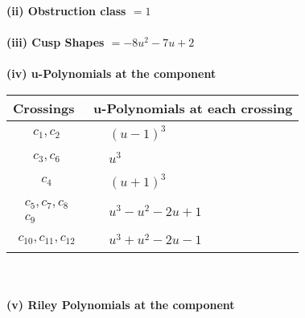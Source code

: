 \documentclass[1p]{elsarticle_modified}
\theoremstyle{definition}
\begin{document}
\flushleft \textbf{(ii) Obstruction class $= 1$}\\~\\
\flushleft \textbf{(iii) Cusp Shapes $= -8 u^2-7 u+2$}\\~\\
\newpage\renewcommand{\arraystretch}{1}
\flushleft \textbf{(iv) u-Polynomials at the component}\newline \\
\begin{tabular}{m{50pt}|m{274pt}}
Crossings & \hspace{64pt}u-Polynomials at each crossing \\
\hline $$\begin{aligned}c_{1},c_{2}\end{aligned}$$&$\begin{aligned}
&(u-1)^3
\end{aligned}$\\
\hline $$\begin{aligned}c_{3},c_{6}\end{aligned}$$&$\begin{aligned}
&u^3
\end{aligned}$\\
\hline $$\begin{aligned}c_{4}\end{aligned}$$&$\begin{aligned}
&(u+1)^3
\end{aligned}$\\
\hline $$\begin{aligned}c_{5},c_{7},c_{8}\\c_{9}\end{aligned}$$&$\begin{aligned}
&u^3- u^2-2 u+1
\end{aligned}$\\
\hline $$\begin{aligned}c_{10},c_{11},c_{12}\end{aligned}$$&$\begin{aligned}
&u^3+u^2-2 u-1
\end{aligned}$\\
\hline
\end{tabular}\\~\\
\newpage\renewcommand{\arraystretch}{1}
\flushleft \textbf{(v) Riley Polynomials at the component}\newline \\
\end{document}
